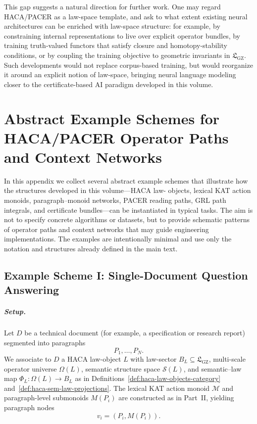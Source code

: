 \documentclass[11pt]{book}
\theoremstyle{plain}
\theoremstyle{definition}
\theoremstyle{remark}
\newcommand{\GZLS}{\ensuremath{\mathfrak{L}_{\mathrm{GZ}}}}       \newcommand{\GZLT}{\ensuremath{M_{!w}}}                           \newcommand{\GZLOC}{\ensuremath{A_M}}                             \newcommand{\GZLC}{\ensuremath{\omega_{\mathrm{law}}}}            \newcommand{\GZLCurv}{\ensuremath{\mathcal{F}_{\mathrm{law}}}}
\begin{document}
This gap suggests a natural direction for further work. One may regard
HACA/PACER as a law-space template, and ask to what extent existing
neural architectures can be enriched with law-space structure: for
example, by constraining internal representations to live over explicit
operator bundles, by training truth-valued functors that satisfy
closure and homotopy-stability conditions, or by coupling the training
objective to geometric invariants in $\GZLS$. Such developments would not
replace corpus-based training, but would reorganize it around an
explicit notion of law-space, bringing neural language modeling closer
to the certificate-based AI paradigm developed in this volume.





\appendix

\chapter{Abstract Example Schemes for HACA/PACER Operator Paths and Context Networks}


In this appendix we collect several abstract example schemes that
illustrate how the structures developed in this volume---HACA law-
objects, lexical KAT action monoids, paragraph--monoid networks,
PACER reading paths, GRL path integrals, and certificate bundles---can
be instantiated in typical tasks. The aim is not to specify concrete
algorithms or datasets, but to provide schematic patterns of operator
paths and context networks that may guide engineering implementations.
The examples are intentionally minimal and use only the notation and
structures already defined in the main text.

\section{Example Scheme I: Single-Document Question Answering}


\paragraph{Setup.}
Let $D$ be a technical document (for example, a specification or
research report) segmented into paragraphs
\[
  P_1,\dots,P_N.
\]
We associate to $D$ a HACA law-object $L$ with law-sector
$B_L\subseteq\GZLS$, multi-scale operator universe $\Omega(L)$,
semantic structure space $\mathcal{S}(L)$, and semantic--law map
$\Phi_L:\Omega(L)\to B_L$ as in
Definitions~\ref{def:haca-law-objects-category}
and~\ref{def:haca-sem-law-projections}. The lexical KAT action monoid
$\mathcal{M}$ and paragraph-level submonoids $M(P_i)$ are constructed
as in Part~II, yielding paragraph nodes
\[
  v_i = (P_i,M(P_i)).
\]
\end{document}
